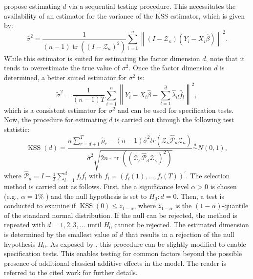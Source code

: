 \citet{kneip2012new} propose estimating $d$ via a sequential testing procedure. This necessitates the availability of an estimator for the variance of the \ac{KSS} estimator, which is given by:
\begin{equation}
    \hat{\sigma}^2=\frac{1}{(n-1) \operatorname{tr}\left(\left(I-\mathcal{Z}_\kappa\right)^2\right)} \sum_{i=1}^n\left\|\left(I-\mathcal{Z}_\kappa\right)\left(Y_i-X_i \hat{\beta}\right)\right\|^2 .
\end{equation}
While this estimator is suited for estimating the factor dimension $d$, \citet{kneip2012new} note that it tends to overestimate the true value of $\sigma^2$. Once the factor dimension $d$ is determined, a better suited estimator for $\sigma^2$ is:
\begin{equation}
\tilde{\sigma}^2=\frac{1}{(n-1) T} \sum_{i=1}^n\left\|Y_i-X_i \hat{\beta}-\sum_{l=1}^{\hat{d}} \hat{\lambda}_{i l} \hat{f}_l\right\|^2,
\end{equation}
which is a consistent estimator for $\sigma^2$ and can be used for specification tests. Now, the procedure for estimating $d$ is carried out through the following test statistic:
\begin{equation}
    \operatorname{KSS}(d)=\frac{n \sum_{r=d+1}^T \hat{\rho}_r-(n-1) \hat{\sigma}^2 t r\left(\mathcal{Z}_\kappa \hat{\mathcal{P}}_d \mathcal{Z}_\kappa\right)}{\hat{\sigma}^2 \sqrt{2 n \cdot \operatorname{tr}\left(\left(\mathcal{Z}_\kappa \hat{\mathcal{P}}_d \mathcal{Z}_\kappa\right)^2\right)}} \stackrel{a}{\sim} N(0,1) ,
\end{equation}
where $\hat{\mathcal{P}}_d=I-\frac{1}{T} \sum_{l=1}^d f_l f_l^{\prime}$ with $f_l=\left(f_l(1), \ldots, f_l(T)\right)^{\prime}$. The selection method is carried out as follows. First, the a significance level $\alpha > 0$ is chosen  (e.g., $\alpha=1 \%$ ) and the null hypothesis is set to $H_0: d=0$. Then, a test is conducted to examine if $\operatorname{KSS}(0) \leq z_{1-\alpha}$, where $z_{1-\alpha}$ is the $(1-\alpha)$-quantile of the standard normal distribution. If the null can be rejected, the method is repeated with $d=1,2,3, \ldots$ until $H_0$ cannot be rejected. The estimated dimension is determined by the smallest value of $d$ that results in a rejection of the null hypothesis $H_0$. As exposed by \citet{bada2012phtt}, this procedure can be slightly modified to enable specification tests. This enables testing for common factors beyond the possible presence of additional classical additive effects in the model. The reader is referred to the cited work for further details. 

